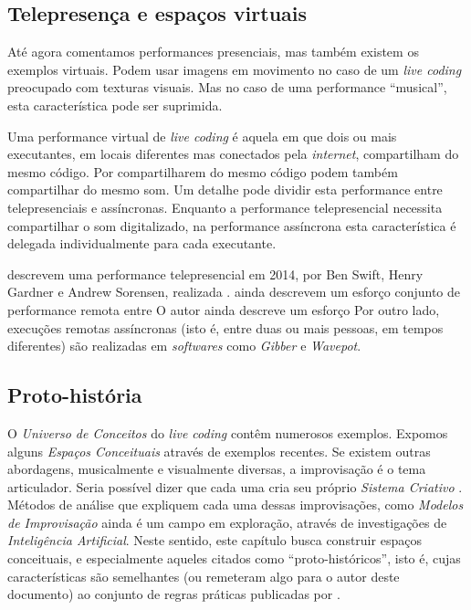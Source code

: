\subsection{Telepresença e espaços virtuais}

Até agora comentamos performances presenciais, mas também existem os exemplos virtuais. Podem usar imagens em movimento no caso de um \emph{live coding} preocupado com texturas visuais. Mas no caso de uma performance ``musical'', esta característica pode ser suprimida. 

Uma performance virtual de \emph{live coding} é aquela em que dois ou mais executantes, em locais diferentes mas conectados pela \emph{internet}, compartilham do mesmo código. Por compartilharem do mesmo código podem também compartilhar do mesmo som. Um detalhe pode dividir esta performance entre telepresenciais e assíncronas. Enquanto a performance telepresencial necessita compartilhar o som digitalizado, na performance assíncrona esta característica é delegada individualmente para cada executante.  

 descrevem uma performance telepresencial em 2014, por Ben Swift, Henry Gardner e Andrew Sorensen, realizada .   ainda descrevem um esforço conjunto de performance remota entre  O autor ainda descreve um esforço Por outro lado, execuções remotas assíncronas (isto é, entre duas ou mais pessoas, em tempos diferentes) são realizadas em \emph{softwares} como \emph{Gibber} \cite{roberts_gibber:_2012} e \emph{Wavepot}.    

\subsection{Proto-história}\label{sec:protohistoria}

O \emph{Universo de Conceitos} do \emph{live coding} contêm numerosos exemplos. Expomos alguns \emph{Espaços Conceituais} através de exemplos recentes. Se existem outras abordagens, musicalmente e visualmente diversas, a improvisação é o tema articulador. Seria possível dizer que cada uma cria seu próprio \emph{Sistema Criativo} . Métodos de análise que expliquem cada uma dessas improvisações, como \emph{Modelos de Improvisação} ainda é um campo em exploração, através de investigações de \emph{Inteligência Artificial}. Neste sentido, este capítulo busca construir espaços conceituais, e especialmente aqueles citados como ``proto-históricos'', isto é, cujas características são semelhantes (ou remeteram algo para o autor deste documento) ao conjunto de regras práticas publicadas por .

